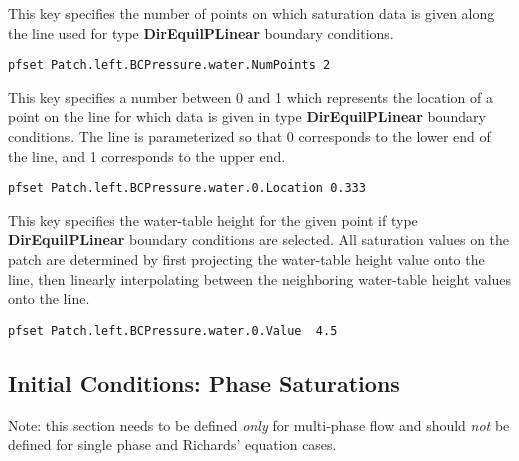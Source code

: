 {
This key specifies the number of points on which saturation data is
given along the line used for type {\bf DirEquilPLinear} boundary
conditions.
}
\begin{display}\begin{verbatim}
pfset Patch.left.BCPressure.water.NumPoints 2
\end{verbatim}\end{display}

{
This key specifies a number between 0 and 1 which represents the
location of a point on the line for which data is given in type
{\bf DirEquilPLinear} boundary conditions.  The line is parameterized
so that  0 corresponds to the lower end of the line, and 1 corresponds
to the upper end.
}
\begin{display}\begin{verbatim}
pfset Patch.left.BCPressure.water.0.Location 0.333
\end{verbatim}\end{display}

{
This key specifies the water-table height for the given point if type
{\bf DirEquilPLinear} boundary conditions are selected.  All saturation
values on the patch are determined by first projecting the water-table
height value onto the line, then linearly interpolating between the
neighboring water-table height values onto the line.
}
\begin{display}\begin{verbatim}
pfset Patch.left.BCPressure.water.0.Value  4.5
\end{verbatim}\end{display}


\subsection{Initial Conditions: Phase Saturations}
\label{Initial Conditions: Phase Saturations}

Note: this section needs to be defined {\em only} for multi-phase flow
and should {\em not} be defined for single phase and Richards' equation cases.


